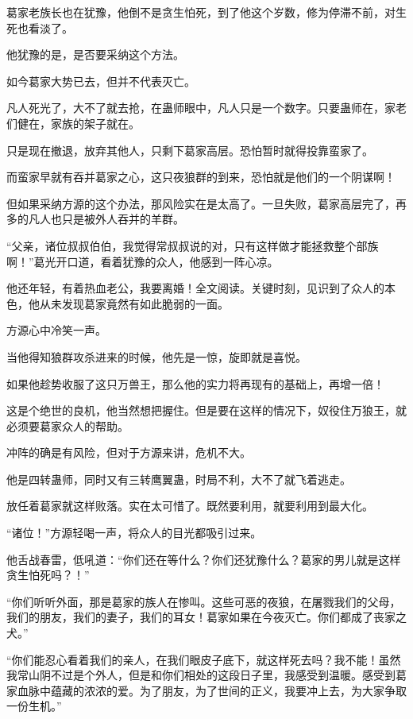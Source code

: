 
\begin{this_body}

葛家老族长也在犹豫，他倒不是贪生怕死，到了他这个岁数，修为停滞不前，对生死也看淡了。

他犹豫的是，是否要采纳这个方法。

如今葛家大势已去，但并不代表灭亡。

凡人死光了，大不了就去抢，在蛊师眼中，凡人只是一个数字。只要蛊师在，家老们健在，家族的架子就在。

只是现在撤退，放弃其他人，只剩下葛家高层。恐怕暂时就得投靠蛮家了。

而蛮家早就有吞并葛家之心，这只夜狼群的到来，恐怕就是他们的一个阴谋啊！

但如果采纳方源的这个办法，那风险实在是太高了。一旦失败，葛家高层完了，再多的凡人也只是被外人吞并的羊群。

“父亲，诸位叔叔伯伯，我觉得常叔叔说的对，只有这样做才能拯救整个部族啊！”葛光开口道，看着犹豫的众人，他感到一阵心凉。

他还年轻，有着热血老公，我要离婚！全文阅读。关键时刻，见识到了众人的本色，他从未发现葛家竟然有如此脆弱的一面。

方源心中冷笑一声。

当他得知狼群攻杀进来的时候，他先是一惊，旋即就是喜悦。

如果他趁势收服了这只万兽王，那么他的实力将再现有的基础上，再增一倍！

这是个绝世的良机，他当然想把握住。但是要在这样的情况下，奴役住万狼王，就必须要葛家众人的帮助。

冲阵的确是有风险，但对于方源来讲，危机不大。

他是四转蛊师，同时又有三转鹰翼蛊，时局不利，大不了就飞着逃走。

放任着葛家就这样败落。实在太可惜了。既然要利用，就要利用到最大化。

“诸位！”方源轻喝一声，将众人的目光都吸引过来。

他舌战春雷，低吼道：“你们还在等什么？你们还犹豫什么？葛家的男儿就是这样贪生怕死吗？！”

“你们听听外面，那是葛家的族人在惨叫。这些可恶的夜狼，在屠戮我们的父母，我们的朋友，我们的妻子，我们的耳女！葛家如果在今夜灭亡。你们都成了丧家之犬。”

“你们能忍心看着我们的亲人，在我们眼皮子底下，就这样死去吗？我不能！虽然我常山阴不过是个外人，但是和你们相处的这段日子里，我感受到温暖。感受到葛家血脉中蕴藏的浓浓的爱。为了朋友，为了世间的正义，我要冲上去，为大家争取一份生机。”


\end{this_body}
